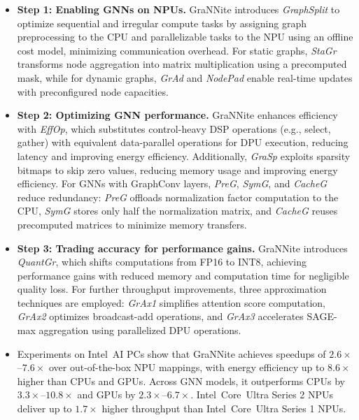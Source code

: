 \begin{itemize}
\color{black}
    \item \textbf{Step 1: Enabling GNNs on NPUs.} GraNNite introduces \textit{GraphSplit} to optimize sequential and irregular compute tasks by assigning graph preprocessing to the CPU and parallelizable tasks to the NPU using an offline cost model, minimizing communication overhead. For static graphs, \textit{StaGr} transforms node aggregation into matrix multiplication using a precomputed mask, while for dynamic graphs, \textit{GrAd} and \textit{NodePad} enable real-time updates with preconfigured node capacities.

    \item \textbf{Step 2: Optimizing GNN performance.} GraNNite enhances efficiency with \textit{EffOp}, which substitutes control-heavy DSP operations (e.g., select, gather) with equivalent data-parallel operations for DPU execution, reducing latency and improving energy efficiency. Additionally, \textit{GraSp} exploits sparsity bitmaps to skip zero values, reducing memory usage and improving energy efficiency. For GNNs with GraphConv layers, \textit{PreG}, \textit{SymG}, and \textit{CacheG} reduce redundancy: \textit{PreG} offloads normalization factor computation to the CPU, \textit{SymG} stores only half the normalization matrix, and \textit{CacheG} reuses precomputed matrices to minimize memory transfers.

    \item \textbf{Step 3: Trading accuracy for performance gains.} GraNNite introduces \textit{QuantGr}, which shifts computations from FP16 to INT8, achieving performance gains with reduced memory and computation time for negligible quality loss. For further throughput improvements, three approximation techniques are employed: \textit{GrAx1} simplifies attention score computation, \textit{GrAx2} optimizes broadcast-add operations, and \textit{GrAx3} accelerates SAGE-max aggregation using parallelized DPU operations.

    \item Experiments on Intel\textregistered\ AI PCs show that GraNNite achieves speedups of $2.6\times$\nobreakdash--$7.6\times$ over out-of-the-box NPU mappings, with energy efficiency up to $8.6\times$ higher than CPUs and GPUs. Across GNN models, it outperforms CPUs by $3.3\times$\nobreakdash--$10.8\times$ and GPUs by $2.3\times$\nobreakdash--$6.7\times$. Intel\textregistered\ Core\texttrademark\ Ultra Series 2 NPUs deliver up to $1.7\times$ higher throughput than Intel\textregistered\ Core\texttrademark\ Ultra Series 1 NPUs.
\end{itemize}


